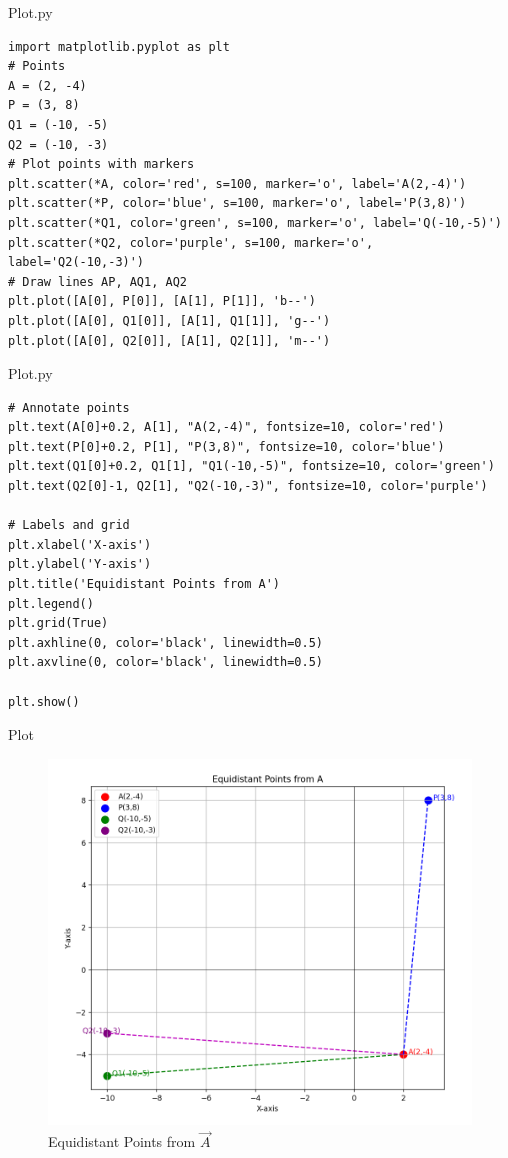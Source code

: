 \documentclass{beamer}
\begin{document}
\begin{frame}[fragile]{Plot.py}
\begin{lstlisting}
import matplotlib.pyplot as plt
# Points
A = (2, -4)
P = (3, 8)
Q1 = (-10, -5)
Q2 = (-10, -3)
# Plot points with markers
plt.scatter(*A, color='red', s=100, marker='o', label='A(2,-4)')
plt.scatter(*P, color='blue', s=100, marker='o', label='P(3,8)')
plt.scatter(*Q1, color='green', s=100, marker='o', label='Q(-10,-5)')
plt.scatter(*Q2, color='purple', s=100, marker='o', label='Q2(-10,-3)')
# Draw lines AP, AQ1, AQ2
plt.plot([A[0], P[0]], [A[1], P[1]], 'b--')
plt.plot([A[0], Q1[0]], [A[1], Q1[1]], 'g--')
plt.plot([A[0], Q2[0]], [A[1], Q2[1]], 'm--')
\end{lstlisting}
\end{frame}

\begin{frame}[fragile]{Plot.py}
\begin{lstlisting}
# Annotate points
plt.text(A[0]+0.2, A[1], "A(2,-4)", fontsize=10, color='red')
plt.text(P[0]+0.2, P[1], "P(3,8)", fontsize=10, color='blue')
plt.text(Q1[0]+0.2, Q1[1], "Q1(-10,-5)", fontsize=10, color='green')
plt.text(Q2[0]-1, Q2[1], "Q2(-10,-3)", fontsize=10, color='purple')

# Labels and grid
plt.xlabel('X-axis') 
plt.ylabel('Y-axis')
plt.title('Equidistant Points from A') 
plt.legend()
plt.grid(True)
plt.axhline(0, color='black', linewidth=0.5) 
plt.axvline(0, color='black', linewidth=0.5)

plt.show()
\end{lstlisting}
\end{frame}

\begin{frame}{Plot}
   \begin{figure}[H]
\centering
\includegraphics[width=0.6\columnwidth]{../beamer/figs/fig1.png}
 \caption*{Equidistant Points from $\vec{A}$}
\label{fig:graph.png}
\end{figure}
\end{frame}
\end{document}
